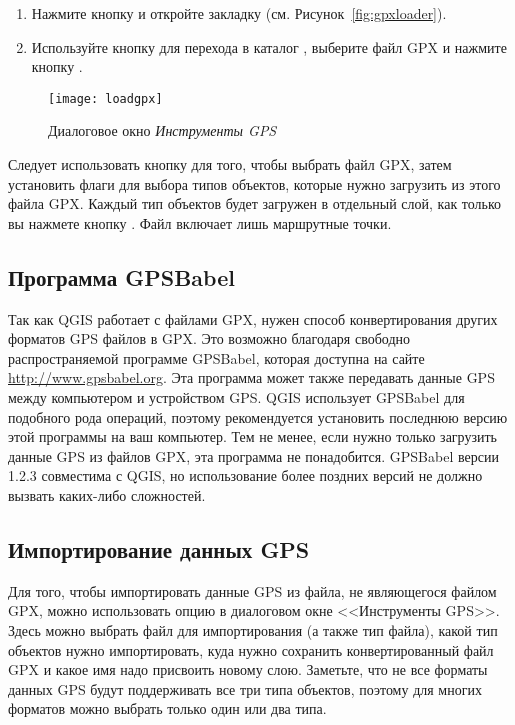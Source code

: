\begin{enumerate}
\item Нажмите кнопку  и
откройте закладку  (см. Рисунок~\ref{fig:gpxloader}).
\item Используйте кнопку  для перехода в каталог
, выберите файл GPX
 и нажмите кнопку .
\end{enumerate}

\begin{figure}[ht]
   \centering
   \texttt{[image: loadgpx]}
   \caption{Диалоговое окно \emph{Инструменты GPS} \nixcaption}\label{gpxloader}
\end{figure}

Следует использовать кнопку \browsebutton для того, чтобы выбрать файл
GPX, затем установить флаги для выбора типов объектов, которые нужно
загрузить из этого файла GPX. Каждый тип объектов будет загружен в
отдельный слой, как только вы нажмете кнопку . Файл
 включает лишь маршрутные точки.

\subsection{Программа GPSBabel}

Так как QGIS работает с файлами GPX, нужен способ конвертирования других
форматов GPS файлов в GPX. Это возможно благодаря свободно
распространяемой программе GPSBabel, которая доступна на сайте
\url{http://www.gpsbabel.org}. Эта программа может также передавать
данные GPS между компьютером и устройством GPS. QGIS использует GPSBabel
для подобного рода операций, поэтому рекомендуется установить последнюю
версию этой программы на ваш компьютер. Тем не менее, если нужно только
загрузить данные GPS из файлов GPX, эта программа не понадобится.
GPSBabel версии 1.2.3 совместима с QGIS, но использование более поздних
версий не должно вызвать каких-либо сложностей.

\subsection{Импортирование данных GPS}

Для того, чтобы импортировать данные GPS из файла, не являющегося файлом
GPX, можно использовать опцию  в диалоговом окне
<<Инструменты GPS>>. Здесь можно выбрать файл для импортирования
(а также тип файла), какой тип объектов нужно импортировать, куда нужно
сохранить конвертированный файл GPX и какое имя надо присвоить новому
слою. Заметьте, что не все форматы данных GPS будут поддерживать все
три типа объектов, поэтому для многих форматов можно выбрать только один
или два типа.

